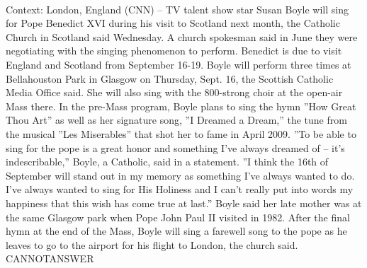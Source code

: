 \documentclass[11pt,a4paper, onecolumn]{article}
\begin{document}
\\ Context: London, England (CNN) -- TV talent show star Susan Boyle will sing for Pope Benedict XVI during his visit to Scotland next month, the Catholic Church in Scotland said Wednesday. A church spokesman said in June they were negotiating with the singing phenomenon to perform. Benedict is due to visit England and Scotland from September 16-19. Boyle will perform three times at Bellahouston Park in Glasgow on Thursday, Sept. 16, the Scottish Catholic Media Office said. She will also sing with the 800-strong choir at the open-air Mass there. In the pre-Mass program, Boyle plans to sing the hymn ''How Great Thou Art'' as well as her signature song, ''I Dreamed a Dream,'' the tune from the musical ''Les Miserables'' that shot her to fame in April 2009. ''To be able to sing for the pope is a great honor and something I've always dreamed of -- it's indescribable,'' Boyle, a Catholic, said in a statement. ''I think the 16th of September will stand out in my memory as something I've always wanted to do. I've always wanted to sing for His Holiness and I can't really put into words my happiness that this wish has come true at last.'' Boyle said her late mother was at the same Glasgow park when Pope John Paul II visited in 1982. After the final hymn at the end of the Mass, Boyle will sing a farewell song to the pope as he leaves to go to the airport for his flight to London, the church said. CANNOTANSWER
\end{document}
